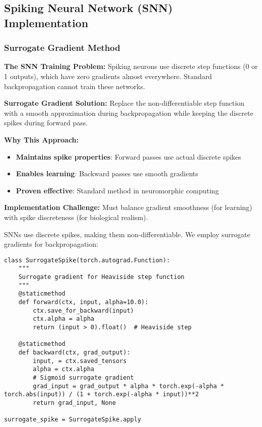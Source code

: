 \documentclass[12pt,a4paper]{article}
\begin{document}
\subsection{Spiking Neural Network (SNN) Implementation}

\subsubsection{Surrogate Gradient Method}

\textbf{The SNN Training Problem:} Spiking neurons use discrete step functions (0 or 1 outputs), which have zero gradients almost everywhere. Standard backpropagation cannot train these networks.

\textbf{Surrogate Gradient Solution:} Replace the non-differentiable step function with a smooth approximation during backpropagation while keeping the discrete spikes during forward pass.

\textbf{Why This Approach:}
\begin{itemize}
    \item \textbf{Maintains spike properties}: Forward passes use actual discrete spikes
    \item \textbf{Enables learning}: Backward passes use smooth gradients
    \item \textbf{Proven effective}: Standard method in neuromorphic computing
\end{itemize}

\textbf{Implementation Challenge:} Must balance gradient smoothness (for learning) with spike discreteness (for biological realism).

SNNs use discrete spikes, making them non-differentiable. We employ surrogate gradients for backpropagation:

\begin{lstlisting}[caption={Surrogate Gradient Implementation - Enabling SNN Training}]
class SurrogateSpike(torch.autograd.Function):
    """
    Surrogate gradient for Heaviside step function
    """
    @staticmethod
    def forward(ctx, input, alpha=10.0):
        ctx.save_for_backward(input)
        ctx.alpha = alpha
        return (input > 0).float()  # Heaviside step

    @staticmethod
    def backward(ctx, grad_output):
        input, = ctx.saved_tensors
        alpha = ctx.alpha
        # Sigmoid surrogate gradient
        grad_input = grad_output * alpha * torch.exp(-alpha * torch.abs(input)) / (1 + torch.exp(-alpha * input))**2
        return grad_input, None

surrogate_spike = SurrogateSpike.apply
\end{lstlisting}
\end{document}
